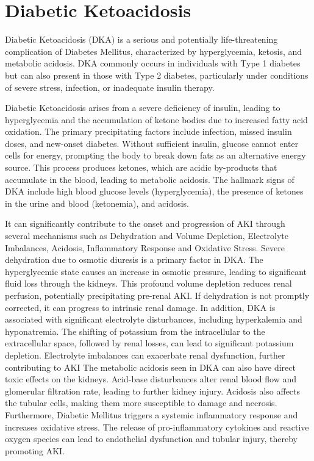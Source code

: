 \documentclass[../main.tex]{subfiles}
\begin{document}
\section{Diabetic Ketoacidosis}
Diabetic Ketoacidosis (DKA) is a serious and potentially life-threatening complication of Diabetes Mellitus, characterized by hyperglycemia, ketosis, and metabolic acidosis. 
DKA commonly occurs in individuals with Type 1 diabetes but can also present in those with Type 2 diabetes, particularly under conditions of severe stress, infection, or inadequate insulin therapy. 

Diabetic Ketoacidosis arises from a severe deficiency of insulin, leading to hyperglycemia and the accumulation of ketone bodies due to increased fatty acid oxidation. 
The primary precipitating factors include infection, missed insulin doses, and new-onset diabetes. 
Without sufficient insulin, glucose cannot enter cells for energy, prompting the body to break down fats as an alternative energy source. 
This process produces ketones, which are acidic by-products that accumulate in the blood, leading to metabolic acidosis. 
The hallmark signs of DKA include high blood glucose levels (hyperglycemia), the presence of ketones in the urine and blood (ketonemia), and acidosis.

It can significantly contribute to the onset and progression of AKI through several mechanisms such as Dehydration and Volume Depletion, Electrolyte Imbalances, Acidosis, Inflammatory Response and Oxidative Stress. 
Severe dehydration due to osmotic diuresis is a primary factor in DKA. 
The hyperglycemic state causes an increase in osmotic pressure, leading to significant fluid loss through the kidneys. 
This profound volume depletion reduces renal perfusion, potentially precipitating pre-renal AKI. 
If dehydration is not promptly corrected, it can progress to intrinsic renal damage.
In addition, DKA is associated with significant electrolyte disturbances, including hyperkalemia and hyponatremia. 
The shifting of potassium from the intracellular to the extracellular space, followed by renal losses, can lead to significant potassium depletion. 
Electrolyte imbalances can exacerbate renal dysfunction, further contributing to AKI
The metabolic acidosis seen in DKA can also have direct toxic effects on the kidneys. 
Acid-base disturbances alter renal blood flow and glomerular filtration rate, leading to further kidney injury. 
Acidosis also affects the tubular cells, making them more susceptible to damage and necrosis.
Furthermore, Diabetic Mellitus triggers a systemic inflammatory response and increases oxidative stress. 
The release of pro-inflammatory cytokines and reactive oxygen species can lead to endothelial dysfunction and tubular injury, thereby promoting AKI.
\end{document}
